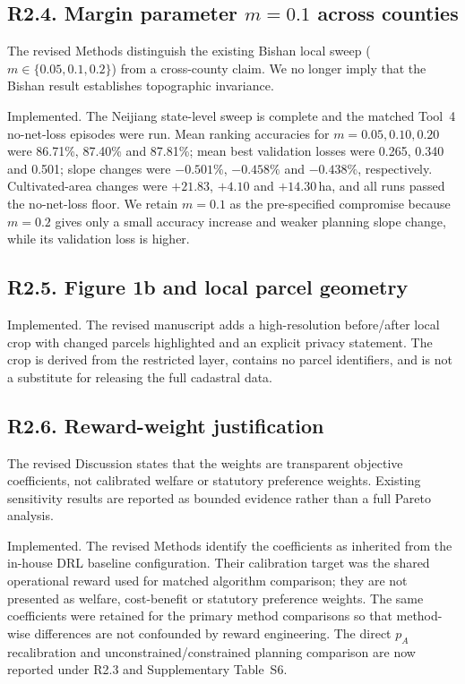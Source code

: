 ﻿\documentclass[11pt]{article}
\begin{document}
\subsection*{R2.4. Margin parameter $m=0.1$ across counties}
The revised Methods distinguish the existing Bishan local sweep ($m\in\{0.05,0.1,0.2\}$) from a cross-county claim. We no longer imply that the Bishan result establishes topographic invariance.

Implemented. The Neijiang state-level sweep is complete and the matched Tool~4 no-net-loss episodes were run. Mean ranking accuracies for $m=0.05,0.10,0.20$ were 86.71\%, 87.40\% and 87.81\%; mean best validation losses were 0.265, 0.340 and 0.501; slope changes were $-0.501\%$, $-0.458\%$ and $-0.438\%$, respectively. Cultivated-area changes were $+21.83$, $+4.10$ and $+14.30$\,ha, and all runs passed the no-net-loss floor. We retain $m=0.1$ as the pre-specified compromise because $m=0.2$ gives only a small accuracy increase and weaker planning slope change, while its validation loss is higher.

\subsection*{R2.5. Figure 1b and local parcel geometry}
Implemented. The revised manuscript adds a high-resolution before/after local crop with changed parcels highlighted and an explicit privacy statement. The crop is derived from the restricted layer, contains no parcel identifiers, and is not a substitute for releasing the full cadastral data.

\subsection*{R2.6. Reward-weight justification}
The revised Discussion states that the weights are transparent objective coefficients, not calibrated welfare or statutory preference weights. Existing sensitivity results are reported as bounded evidence rather than a full Pareto analysis.

Implemented. The revised Methods identify the coefficients as inherited from the in-house DRL baseline configuration. Their calibration target was the shared operational reward used for matched algorithm comparison; they are not presented as welfare, cost-benefit or statutory preference weights. The same coefficients were retained for the primary method comparisons so that method-wise differences are not confounded by reward engineering. The direct $p_A$ recalibration and unconstrained/constrained planning comparison are now reported under R2.3 and Supplementary Table~S6.
\end{document}
